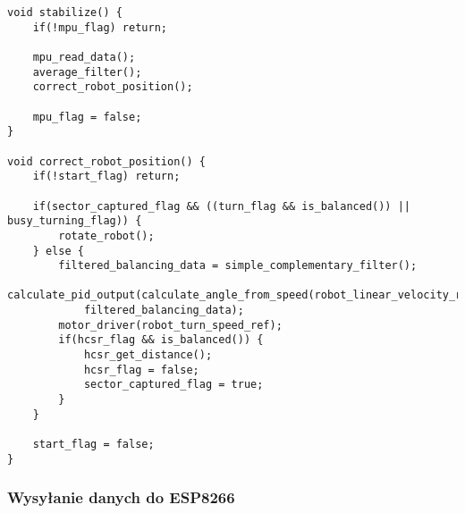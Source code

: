 \documentclass[a4paper,12pt,twoside,openany]{report}
\begin{document}
\begin{lstlisting}[style=customc]
void stabilize() {
	if(!mpu_flag) return;
	
	mpu_read_data();
	average_filter();
	correct_robot_position();
	
	mpu_flag = false;
}

void correct_robot_position() {
	if(!start_flag) return;
	
	if(sector_captured_flag && ((turn_flag && is_balanced()) || busy_turning_flag)) {
		rotate_robot();
	} else {
		filtered_balancing_data = simple_complementary_filter();
		calculate_pid_output(calculate_angle_from_speed(robot_linear_velocity_ref),
			filtered_balancing_data);
		motor_driver(robot_turn_speed_ref);
		if(hcsr_flag && is_balanced()) {
			hcsr_get_distance();
			hcsr_flag = false;
			sector_captured_flag = true;
		}
	}

	start_flag = false;
}

\end{lstlisting}

\subsubsection{Wysyłanie danych do ESP8266}
\end{document}
